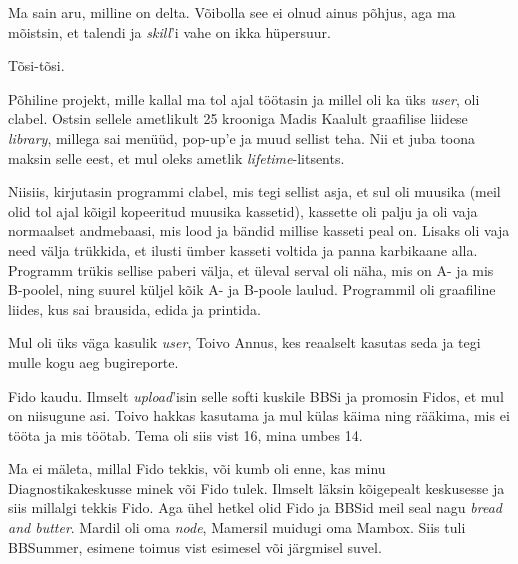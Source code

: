 
Ma sain aru, milline on delta. Võibolla see ei olnud ainus põhjus, aga 
ma mõistsin, et talendi ja \emph{skill}'i vahe on ikka 
hüpersuur.


Tõsi-tõsi.

Põhiline projekt, mille kallal ma tol ajal töötasin ja millel oli ka üks 
\emph{user}, oli clabel. Ostsin sellele
ametlikult 25 krooniga Madis Kaalult graafilise 
liidese \emph{library}, millega sai menüüd, pop-up'e ja muud sellist
teha. Nii et juba toona 
maksin selle eest, et mul oleks ametlik \emph{lifetime}-litsents. 

Niisiis, kirjutasin programmi clabel, mis tegi sellist 
asja, et sul oli muusika (meil olid tol ajal kõigil kopeeritud muusika 
kassetid), kassette oli palju ja oli vaja normaalset andmebaasi,
mis lood ja bändid millise kasseti peal on. Lisaks oli vaja need 
välja trükkida, et ilusti ümber kasseti voltida 
ja panna karbikaane alla. Programm trükis sellise paberi välja, et üleval serval 
oli näha, mis on A- ja mis B-poolel, ning suurel küljel kõik
A- ja B-poole laulud. Programmil oli graafiline liides, kus 
sai brausida, edida ja printida. 


Mul oli üks väga kasulik \emph{user}, Toivo Annus, kes reaalselt kasutas seda ja tegi mulle 
kogu aeg bugireporte.


Fido kaudu. Ilmselt \emph{upload}'isin selle softi kuskile BBSi ja promosin Fidos, et mul on niisugune asi. Toivo hakkas kasutama ja mul külas 
käima ning rääkima, mis ei tööta ja mis töötab. Tema oli siis vist 16, mina 
umbes 14. 


Ma ei mäleta, millal Fido tekkis, või kumb oli enne, kas minu Diagnostikakeskusse minek või Fido tulek. Ilmselt 
läksin kõigepealt keskusesse ja siis millalgi tekkis Fido. Aga ühel hetkel olid Fido ja BBSid meil seal 
nagu \emph{bread and butter}. Mardil oli oma 
\emph{node}, Mamersil muidugi oma Mambox. 
Siis tuli BBSummer, esimene toimus vist esimesel või 
järgmisel suvel. 

